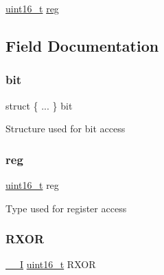 \begin{DoxyCompactItemize}
\begin{tabbing}
\end{tabbing}\item 
\mbox{\hyperlink{union_i2_s___i_n_t_f_l_a_g___type_a25e8fd3335b0c4872c6e2910bd01f0f6}{uint16\+\_\+t}} \mbox{\hyperlink{union_i2_s___i_n_t_f_l_a_g___type_a11760f5020019f4aa8cb02e694f7cc44}{reg}}
\end{DoxyCompactItemize}


\subsection{Field Documentation}
\mbox{\label{union_i2_s___i_n_t_f_l_a_g___type_aff09d8279d486c413f5309e4e3b09886}} 
\subsubsection{\texorpdfstring{bit}{bit}}
{\footnotesize\ttfamily struct \{ ... \}   bit}

Structure used for bit access \mbox{\label{union_i2_s___i_n_t_f_l_a_g___type_a11760f5020019f4aa8cb02e694f7cc44}} 
\subsubsection{\texorpdfstring{reg}{reg}}
{\footnotesize\ttfamily \mbox{\hyperlink{union_i2_s___i_n_t_f_l_a_g___type_a25e8fd3335b0c4872c6e2910bd01f0f6}{uint16\+\_\+t}} reg}

Type used for register access \mbox{\label{union_i2_s___i_n_t_f_l_a_g___type_a37c88c269e76348e6e95bf02a0c74f95}} 
\subsubsection{\texorpdfstring{RXOR}{RXOR}}
{\footnotesize\ttfamily \mbox{\hyperlink{core__cm0plus_8h_af63697ed9952cc71e1225efe205f6cd3}{\+\_\+\+\_\+I}} \mbox{\hyperlink{union_i2_s___i_n_t_f_l_a_g___type_a25e8fd3335b0c4872c6e2910bd01f0f6}{uint16\+\_\+t}} R\+X\+OR}

